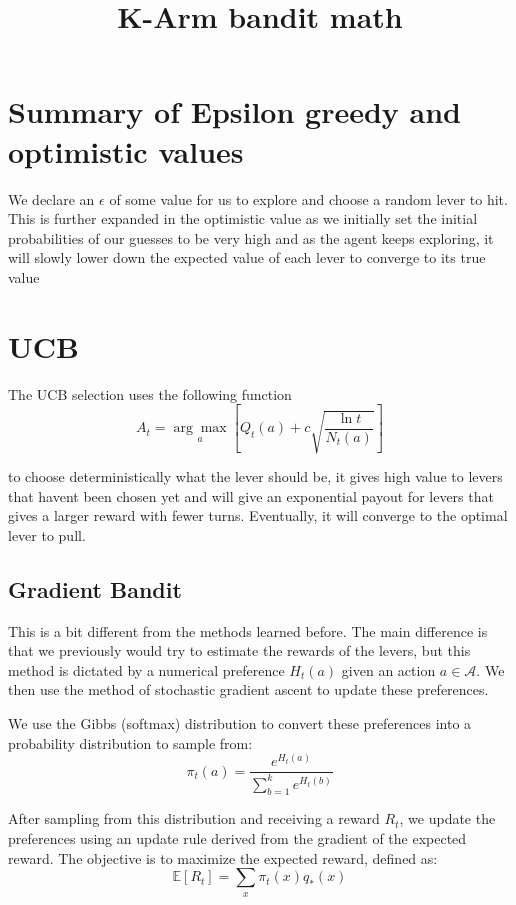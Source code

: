 \documentclass{article}
\title{K-Arm bandit math}
\begin{document}
\maketitle



\section{Summary of Epsilon greedy and optimistic values}

We declare an $\epsilon$ of some value for us to explore and choose a random lever to hit. This is further expanded in the optimistic value as we initially set the 
initial probabilities of our guesses to be very high and as the agent keeps exploring, it will slowly lower down the expected value of each lever to converge to its true value


\section{UCB}
The UCB selection uses the following function
\begin{equation}
   A_t = \underset{a}{\arg\max} \left[ Q_t(a) + c \sqrt{\frac{\ln t}{N_t(a)}} \right]
\end{equation}

to choose deterministically what the lever should be, it gives high value to levers that havent been chosen yet and will give an exponential payout for levers that gives a larger
reward with fewer turns. Eventually, it will converge to the optimal lever to pull. 

\subsection{Gradient Bandit}
This is a bit different from the methods learned before. The main difference is that we previously would try to estimate the rewards of the levers, but this method is dictated by a numerical preference $H_t(a)$ given an action $a \in \mathcal{A}$. We then use the method of stochastic gradient ascent to update these preferences. 

We use the Gibbs (softmax) distribution to convert these preferences into a probability distribution to sample from:
\begin{equation}
    \pi_t(a) = \frac{e^{H_t(a)}}{\sum_{b=1}^k e^{H_t(b)}}
\end{equation}

After sampling from this distribution and receiving a reward $R_t$, we update the preferences using an update rule derived from the gradient of the expected reward. The objective is to maximize the expected reward, defined as:
\begin{equation}
    \mathbb{E}[R_t] = \sum_{x} \pi_t(x) q_*(x)
\end{equation}
\end{document}
